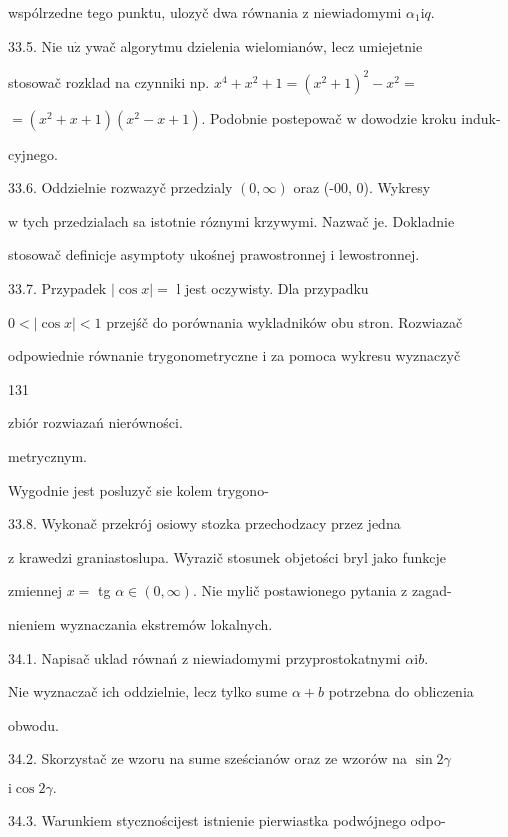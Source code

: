 \documentclass[a4paper,12pt]{article}
\begin{document}
wspólrzedne tego punktu, ulozyč dwa równania $\mathrm{z}$ niewiadomymi $\alpha_{1}\mathrm{i}q.$

33.5. Nie $\mathrm{u}\dot{\mathrm{z}}$ ywač algorytmu dzielenia wielomianów, lecz umiejetnie

stosowač rozklad na czynniki np. $x^{4} +x^{2} + 1 = (x^{2}+1)^{2} - x^{2} =$

$=(x^{2}+x+1)(x^{2}-x+1)$. Podobnie postepowač $\mathrm{w}$ dowodzie kroku induk-

cyjnego.

33.6. Oddzielnie rozwazyč przedzialy $(0,\infty)$ oraz (-00, 0). Wykresy

$\mathrm{w}$ tych przedzialach sa istotnie róznymi krzywymi. Nazwač je. Dokladnie

stosowač definicje asymptoty ukośnej prawostronnej $\mathrm{i}$ lewostronnej.

33.7. Przypadek $|\cos x| =$ l jest oczywisty. Dla przypadku

$0< |\cos x| <1$ przejśč do porównania wykladników obu stron. Rozwiazač

odpowiednie równanie trygonometryczne $\mathrm{i}$ za pomoca wykresu wyznaczyč





131

zbiór rozwiazań nierówności.

metrycznym.

Wygodnie jest posluzyč sie kolem trygono-

33.8. Wykonač przekrój osiowy stozka przechodzacy przez jedna

$\mathrm{z}$ krawedzi graniastoslupa. Wyrazič stosunek objetości bryl jako funkcje

zmiennej $x =$ tg $\alpha \in (0,\infty)$. Nie mylič postawionego pytania $\mathrm{z}$ zagad-

nieniem wyznaczania ekstremów lokalnych.

34.1. Napisač uklad równań $\mathrm{z}$ niewiadomymi przyprostokatnymi $\alpha \mathrm{i}b.$

Nie wyznaczač ich oddzielnie, lecz tylko sume $\alpha+b$ potrzebna do obliczenia

obwodu.

34.2. Skorzystač ze wzoru na sume sześcianów oraz ze wzorów na $\sin 2\gamma$

$\mathrm{i}\cos 2\gamma.$

34.3. Warunkiem stycznościjest istnienie pierwiastka podwójnego odpo-
\end{document}
